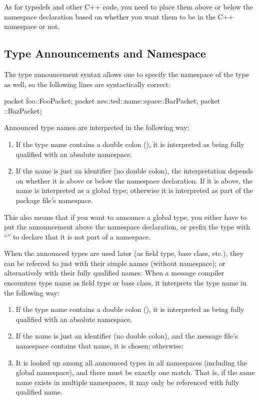 As for typedefs and other C++ code, you need to place them above or below
the namespace declaration based on whether you want them to be in the C++
namespace or not.

\subsection{Type Announcements and Namespace}
\label{sec:msg-def:type-announcements-and-namespace}

The type announcement syntax allows one to specify the namespace of the type
as well, so the following lines are syntactically correct:

\begin{msg}
packet foo::FooPacket;
packet nes::ted::name::space::BarPacket;
packet ::BazPacket;
\end{msg}

Announced type names are interpreted in the following way:

\begin{enumerate}
\item If the type name contains a double colon (\ttt{::}), it is interpreted
      as being fully qualified with an absolute namespace.
\item If the name is just an identifier (no double colon), the interpretation
      depends on whether it is above or below the namespace declaration.
      If it is above, the name is interpreted as a global type; otherwise
      it is interpreted as part of the package file's namespace.
\end{enumerate}

This also means that if you want to announce a global type, you either
have to put the announcement above the namespace declaration, or prefix
the type with ``\ttt{::}'' to declare that it is not part of a namespace.

When the announced types are used later (as field type, base class, etc.),
they can be referred to just with their simple names (without namespace);
or alternatively with their fully qualified names. When a message compiler
encounters type name as field type or base class, it interprets the type
name in the following way:

\begin{enumerate}
\item If the type name contains a double colon (\ttt{::}), it is interpreted
      as being fully qualified with an absolute namespace.
\item If the name is just an identifier (no double colon), and the message
      file's namespace contains that name, it is chosen; otherwise:
\item It is looked up among all announced types in all namespaces (including
      the global namespace), and there must be exactly one match. That is,
      if the same name exists in multiple namespaces, it may only be
      referenced with fully qualified name.
\end{enumerate}

